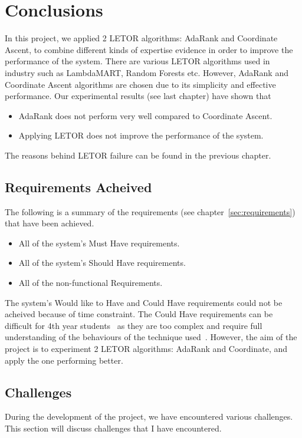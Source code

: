 
\chapter{Conclusions}
In this project, we applied 2 LETOR algorithms: AdaRank and Coordinate Ascent, to combine different kinds of expertise evidence in order 
to improve the performance of the system. There are various LETOR algorithms used in industry such as LambdaMART, Random Forests etc. 
However, AdaRank and Coordinate Ascent algorithms are chosen due to its simplicity and effective performance. Our experimental results (see last chapter) have shown that
\begin{itemize}
 \item AdaRank does not perform very well compared to Coordinate Ascent.
 \item Applying LETOR does not improve the performance of the system.
\end{itemize}

\noindent The reasons behind LETOR failure can be found in the previous chapter.

\section{Requirements Acheived}
The following is a summary of the requirements (see chapter~\ref{sec:requirements}) that have been achieved.
\begin{itemize}
 \item All of the system's Must Have requirements.
 \item All of the system's Should Have requirements.
 \item All of the non-functional Requirements.
\end{itemize}
The system's Would like to Have and Could Have requirements could not be acheived because of time constraint.
The Could Have requirements can be difficult for 4th year students~\cite{craig} as they are too complex and require full understanding of the 
behaviours of the technique used~\cite{craig}.
However, the aim of the project is to experiment 2 LETOR algorithms: AdaRank and Coordinate, and apply the one performing better.

\section{Challenges}\label{sec:challenges}
During the development of the project, we have encountered various challenges. This section will discuss challenges that I have encountered.

